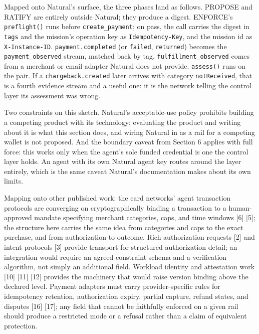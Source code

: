 \documentclass[
  11pt,
  letterpaper,
]{article}
\begin{document}
Mapped onto Natural's surface, the three phases land as follows. PROPOSE
and RATIFY are entirely outside Natural; they produce a digest.
ENFORCE's \texttt{preflight()} runs before \texttt{create\_payment}; on
pass, the call carries the digest in \texttt{tags} and the mission's
operation key as \texttt{Idempotency-Key}, and the mission id as
\texttt{X-Instance-ID}. \texttt{payment.completed} (or \texttt{failed},
\texttt{returned}) becomes the \texttt{payment\_observed} stream,
matched back by tag. \texttt{fulfillment\_observed} comes from a
merchant or email adapter Natural does not provide. \texttt{assess()}
runs on the pair. If a \texttt{chargeback.created} later arrives with
category \texttt{notReceived}, that is a fourth evidence stream and a
useful one: it is the network telling the control layer its assessment
was wrong.

Two constraints on this sketch. Natural's acceptable-use policy
prohibits building a competing product with its technology; evaluating
the product and writing about it is what this section does, and wiring
Natural in as a rail for a competing wallet is not proposed. And the
boundary caveat from Section 6 applies with full force: this works only
when the agent's sole funded credential is one the control layer holds.
An agent with its own Natural agent key routes around the layer
entirely, which is the same caveat Natural's documentation makes about
its own limits.

Mapping onto other published work: the card networks' agent transaction
protocols are converging on cryptographically binding a transaction to a
human-approved mandate specifying merchant categories, caps, and time
windows {[}6{]} {[}5{]}; the structure here carries the same idea from
categories and caps to the exact purchase, and from authorization to
outcome. Rich authorization requests {[}2{]} and intent protocols
{[}3{]} provide transport for structured authorization detail; an
integration would require an agreed constraint schema and a verification
algorithm, not simply an additional field. Workload identity and
attestation work {[}10{]} {[}11{]} {[}12{]} provides the machinery that
would raise version binding above the declared level. Payment adapters
must carry provider-specific rules for idempotency retention,
authorization expiry, partial capture, refund states, and disputes
{[}16{]} {[}17{]}; any field that cannot be faithfully enforced on a
given rail should produce a restricted mode or a refusal rather than a
claim of equivalent protection.
\end{document}
